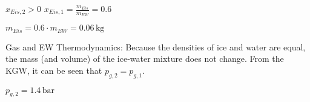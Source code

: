 \( x_{Eis,2} > 0 \)  
\( x_{Eis,1} = \frac{m_{Eis}}{m_{EW}} = 0.6 \)  

\( m_{Eis} = 0.6 \cdot m_{EW} = 0.06 \, \text{kg} \)  

Gas and EW Thermodynamics:  
Because the densities of ice and water are equal, the mass (and volume) of the ice-water mixture does not change. From the KGW, it can be seen that \( p_{g,2} = p_{g,1} \).  

\( p_{g,2} = 1.4 \, \text{bar} \)
